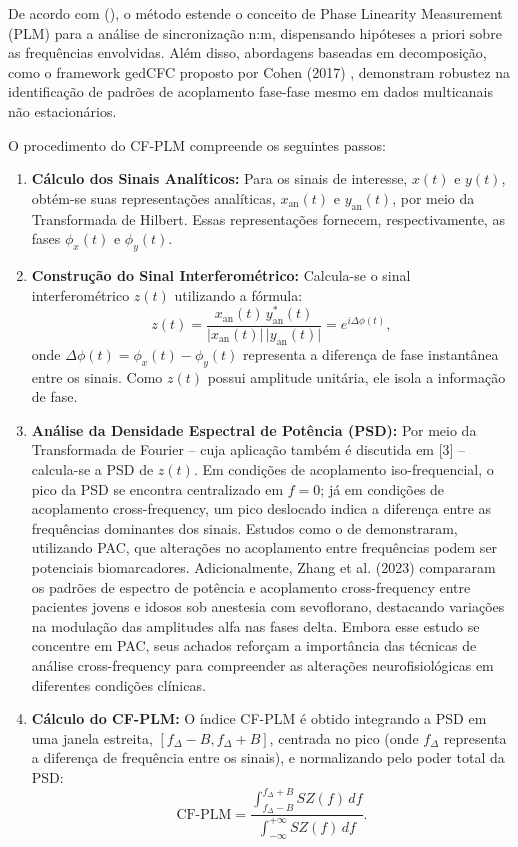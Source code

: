 De acordo com \citeauthor{sorrentino2022detection} (\citeyear{sorrentino2022detection}), o método estende o conceito de Phase Linearity Measurement (PLM) para a análise de sincronização n:m, dispensando hipóteses a priori sobre as frequências envolvidas. Além disso, abordagens baseadas em decomposição, como o framework gedCFC proposto por Cohen (2017) \cite{cohen2017multivariate}, demonstram robustez na identificação de padrões de acoplamento fase-fase mesmo em dados multicanais não estacionários.

O procedimento do CF-PLM compreende os seguintes passos:

\begin{enumerate}
    \item \textbf{Cálculo dos Sinais Analíticos:} Para os sinais de interesse, \(x(t)\) e \(y(t)\), obtém-se suas representações analíticas, \(x_{\mathrm{an}}(t)\) e \(y_{\mathrm{an}}(t)\), por meio da Transformada de Hilbert. Essas representações fornecem, respectivamente, as fases \(\phi_x(t)\) e \(\phi_y(t)\).
    \item \textbf{Construção do Sinal Interferométrico:} Calcula-se o sinal interferométrico \(z(t)\) utilizando a fórmula:
    \[
    z(t) = \frac{x_{\mathrm{an}}(t)\, y_{\mathrm{an}}^*(t)}{\lvert x_{\mathrm{an}}(t)\rvert\, \lvert y_{\mathrm{an}}(t)\rvert} = e^{i\Delta \phi(t)},
    \]
    onde \(\Delta \phi(t) = \phi_x(t) - \phi_y(t)\) representa a diferença de fase instantânea entre os sinais. Como \(z(t)\) possui amplitude unitária, ele isola a informação de fase.
    \item \textbf{Análise da Densidade Espectral de Potência (PSD):} Por meio da Transformada de Fourier – cuja aplicação também é discutida em [3] – calcula-se a PSD de \(z(t)\). Em condições de acoplamento iso-frequencial, o pico da PSD se encontra centralizado em \(f = 0\); já em condições de acoplamento cross-frequency, um pico deslocado indica a diferença entre as frequências dominantes dos sinais. Estudos como o de \cite{chen2023multiple} demonstraram, utilizando PAC, que alterações no acoplamento entre frequências podem ser potenciais biomarcadores. Adicionalmente, Zhang et al. (2023) \cite{zhang2023differences} compararam os padrões de espectro de potência e acoplamento cross-frequency entre pacientes jovens e idosos sob anestesia com sevoflorano, destacando variações na modulação das amplitudes alfa nas fases delta. Embora esse estudo se concentre em PAC, seus achados reforçam a importância das técnicas de análise cross-frequency para compreender as alterações neurofisiológicas em diferentes condições clínicas.
    \item \textbf{Cálculo do CF-PLM:} O índice CF-PLM é obtido integrando a PSD em uma janela estreita, \([f_\Delta - B, f_\Delta + B]\), centrada no pico (onde \(f_\Delta\) representa a diferença de frequência entre os sinais), e normalizando pelo poder total da PSD:
    \[
    \text{CF-PLM} = \frac{\displaystyle\int_{f_\Delta - B}^{f_\Delta + B} SZ(f) \, df}{\displaystyle\int_{-\infty}^{+\infty} SZ(f) \, df}.
    \]
\end{enumerate}

